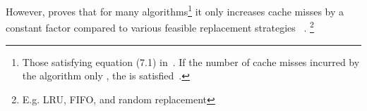 %
However, \citeauthor{coa-thesis} proves that for many algorithms\footnote{%
   Those satisfying equation (7.1) in~\cite[46]{coa-thesis}.  If the number of cache
   misses incurred by the algorithm only , the  is satisfied~\cite[6]{erikcom}.
}
it only increases cache misses by a constant factor compared to various feasible
replacement strategies%
~\cite[corollary 19, \pno~46]{coa-thesis}.%
\footnote{%
   E.g. LRU, FIFO, and random replacement
}

%
%


